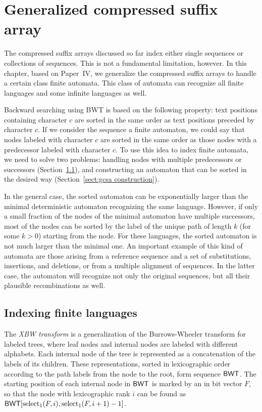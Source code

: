 \chapter{Generalized compressed suffix array}\label{chapter:gcsa}

The compressed suffix arrays discussed so far index either single sequences or collections of sequences. This is not a fundamental limitation, however. In this chapter, based on Paper~IV, we generalize the compressed suffix arrays to handle a certain class finite automata. This class of automata can recognize all finite languages and some infinite languages as well.

Backward searching using BWT is based on the following property: text positions containing character $c$ are sorted in the same order as text positions preceded by character $c$. If we consider the sequence a finite automaton, we could say that nodes labeled with character $c$ are sorted in the same order as those nodes with a predecessor labeled with character $c$. To use this idea to index finite automata, we need to solve two problems: handling nodes with multiple predecessors or successors (Section~\ref{sect:gcsa}), and constructing an automaton that can be sorted in the desired way (Section~\ref{sect:gcsa construction}).

In the general case, the sorted automaton can be exponentially larger than the minimal deterministic automaton recognizing the same language. However, if only a small fraction of the nodes of the minimal automaton have multiple successors, most of the nodes can be sorted by the label of the unique path of length $k$ (for some $k > 0$) starting from the node. For these languages, the sorted automaton is not much larger than the minimal one. An important example of this kind of automata are those arising from a reference sequence and a set of substitutions, insertions, and deletions, or from a multiple alignment of sequences. In the latter case, the automaton will recognize not only the original sequences, but all their plausible recombinations as well.
\newpage


\section{Indexing finite languages}\label{sect:gcsa}

The {\em XBW transform} \cite{Ferragina2009b} is a generalization of the Burrows-Wheeler transform for labeled trees, where leaf nodes and internal nodes are labeled with different alphabets. Each internal node of the tree is represented as a concatenation of the labels of its children. These representations, sorted in lexicographic order according to the path labels from the node to the root, form sequence $\mathsf{BWT}$. The starting position of each internal node in $\mathsf{BWT}$ is marked by an \onebit{} in bit vector $F$, so that the node with lexicographic rank $i$ can be found as $\mathsf{BWT}[\operatorname{select}_{1}(F,i), \operatorname{select}_{1}(F,i+1) - 1]$.

